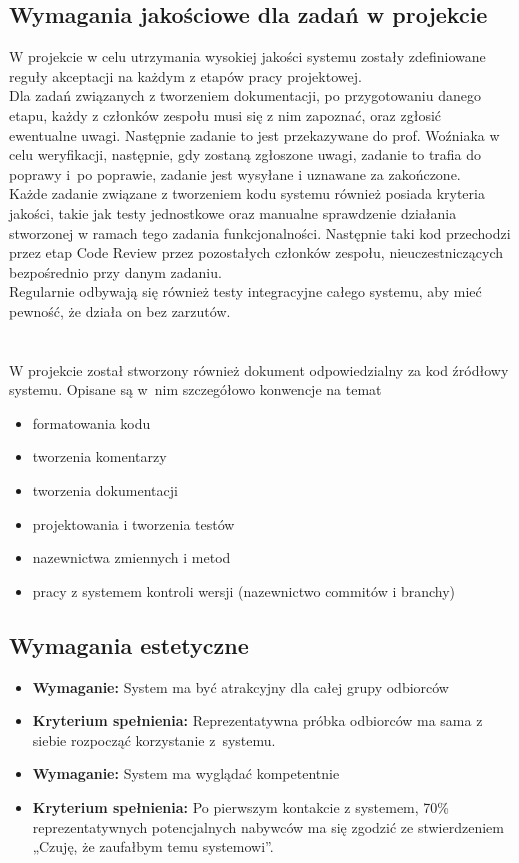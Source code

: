 \documentclass{article}
\begin{document}
\subsection{Wymagania jakościowe dla zadań w projekcie}

W projekcie w celu utrzymania wysokiej jakości systemu zostały zdefiniowane reguły akceptacji na każdym z etapów pracy projektowej. \\
Dla zadań związanych z tworzeniem dokumentacji, po przygotowaniu danego etapu, każdy z członków zespołu musi się z nim zapoznać, oraz zgłosić ewentualne uwagi. Następnie zadanie to jest przekazywane do prof. Woźniaka w celu weryfikacji, następnie, gdy zostaną zgłoszone uwagi, zadanie to trafia do poprawy i~po poprawie, zadanie jest wysyłane i uznawane za zakończone. \\
Każde zadanie związane z tworzeniem kodu systemu również posiada kryteria jakości, takie jak testy jednostkowe oraz manualne sprawdzenie działania stworzonej w ramach tego zadania funkcjonalności. Następnie taki kod przechodzi przez etap Code Review przez pozostałych członków zespołu, nieuczestniczących bezpośrednio przy danym zadaniu.\\
Regularnie odbywają się również testy integracyjne całego systemu, aby mieć pewność, że działa on bez zarzutów.
\mbox{}\\\mbox{}\\\mbox{}\\
W projekcie został stworzony również dokument odpowiedzialny za kod źródłowy systemu. Opisane są w~nim szczegółowo konwencje na temat
\begin{itemize}
\item formatowania kodu
\item tworzenia komentarzy
\item tworzenia dokumentacji
\item projektowania i tworzenia testów
\item nazewnictwa zmiennych i metod
\item pracy z systemem kontroli wersji (nazewnictwo commitów i branchy)
\end{itemize}


\subsection{Wymagania estetyczne}
\begin{itemize}
\item \textbf{Wymaganie:} System ma być atrakcyjny dla całej grupy odbiorców
\item \textbf{Kryterium spełnienia:} Reprezentatywna próbka odbiorców ma sama z siebie rozpocząć korzystanie z~systemu.\\
\end{itemize}
\begin{itemize}
\item \textbf{Wymaganie:} System ma wyglądać kompetentnie
\item \textbf{Kryterium spełnienia:} Po pierwszym kontakcie z systemem, 70\% reprezentatywnych potencjalnych nabywców ma się zgodzić ze stwierdzeniem „Czuję, że zaufałbym temu systemowi”.
\end{itemize}
\end{document}
